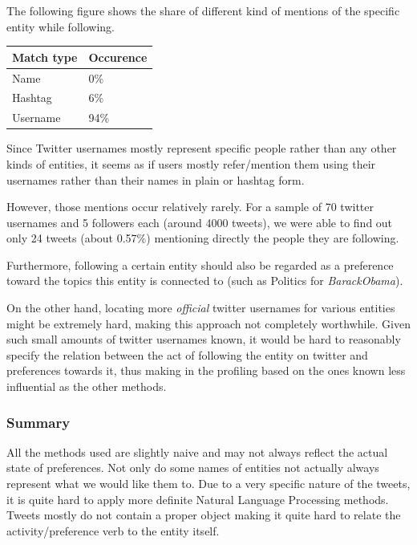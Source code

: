 \documentclass{article}
\begin{document}
The following figure shows the share of different kind of mentions of the specific entity while following.

\begin{center}
  \begin{tabular}{ | p{3cm}| p{2cm} | } \hline
    Match type & Occurence \\ \hline
    Name & 0\% \\ \hline
    Hashtag & 6\% \\ \hline
	Username & 94\% \\ \hline
  \end{tabular}
\end{center}

Since Twitter usernames mostly represent specific people rather than any other kinds of entities, it seems as if users mostly
refer/mention them using their usernames rather than their names in plain or hashtag form.

However, those mentions occur relatively rarely. For a sample of 70 twitter usernames and 5 followers each 
(around 4000 tweets), we were able to find out only 24 tweets (about 0.57\%) mentioning directly the people they are following.

Furthermore, following a certain entity should also be regarded as a preference toward the topics this entity is connected to (such as 
Politics for \textit{BarackObama}).

On the other hand, locating more \textit{official} twitter usernames for various entities might be extremely hard, 
making this approach not completely worthwhile. Given such small amounts of twitter usernames known, it would be 
hard to reasonably specify the relation between the act of following the entity on twitter and preferences
towards it, thus making in the profiling based on the ones known less influential as the other methods.

\subsubsection{Summary}
All the methods used are slightly naive and may not always reflect the actual
state of preferences. Not only do some names of entities not actually always
represent what we would like them to. Due to a very specific nature of the
tweets, it is quite hard to apply more definite Natural Language Processing
methods. Tweets mostly do not contain a proper object making it quite hard to
relate the activity/preference verb to the entity itself.
\end{document}
